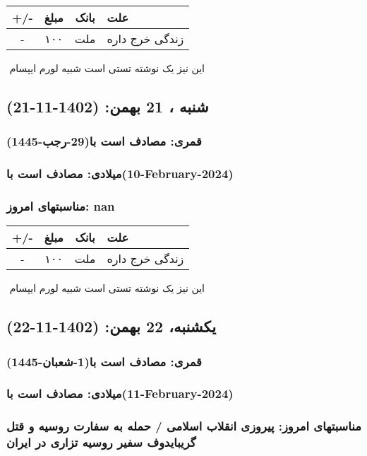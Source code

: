 \documentclass{article}
\newcommand{\rnote}[1]{\marginpar{\textcolor{color}{\StrSubstitute{\##1}{ }{\_}}}}
\newcommand{\myRow}[4]{
    #1 & #2 & #3 & #4 \\ \hline
}
\begin{document}
\begin{tabular}{ | c | c | c | p{5cm} |}
    \hline
    \myRow{ +/- }{مبلغ}{بانک}{علت}
    \myRow{-}{۱۰۰}{ملت}{زندگی خرج داره}
\end{tabular}
\newline
\newline

‌
\rnote{تست}
این نیز یک نوشته تستی است شبیه لورم ایپسام




\newpage
{}
\textcolor{color}{
\section{ شنبه ، 21 بهمن: (1402-11-21) }
\subsubsection*{قمری: مصادف است با(29-رجب-1445)} 
\subsubsection*{میلادی: مصادف است با(10-February-2024)}
\subsubsection*{مناسبتهای امروز: nan}
}


\begin{tabular}{ | c | c | c | p{5cm} |}
    \hline
    \myRow{ +/- }{مبلغ}{بانک}{علت}
    \myRow{-}{۱۰۰}{ملت}{زندگی خرج داره}
\end{tabular}
\newline
\newline

‌
\rnote{تست}
این نیز یک نوشته تستی است شبیه لورم ایپسام




\newpage
{}
\textcolor{color}{
\section{ یکشنبه، 22 بهمن: (1402-11-22) }
\subsubsection*{قمری: مصادف است با(1-شعبان-1445)} 
\subsubsection*{میلادی: مصادف است با(11-February-2024)}
\subsubsection*{مناسبتهای امروز: پیروزی انقلاب اسلامی / حمله به سفارت روسیه و قتل گریبایدوف سفیر روسیه تزاری در ایران}
}
\end{document}
